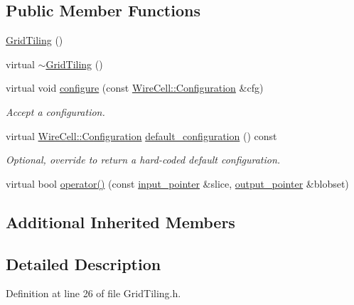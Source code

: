 \subsection*{Public Member Functions}
\begin{DoxyCompactItemize}
\item 
\hyperlink{class_wire_cell_1_1_img_1_1_grid_tiling_af3c3527253987db6b518a38d10c24868}{Grid\+Tiling} ()
\item 
virtual \hyperlink{class_wire_cell_1_1_img_1_1_grid_tiling_ac32a99a32ae16ffc136cdc5ab504ca9a}{$\sim$\+Grid\+Tiling} ()
\item 
virtual void \hyperlink{class_wire_cell_1_1_img_1_1_grid_tiling_a495a866d4d11c4132a390606521de576}{configure} (const \hyperlink{namespace_wire_cell_a9f705541fc1d46c608b3d32c182333ee}{Wire\+Cell\+::\+Configuration} \&cfg)
\begin{DoxyCompactList}\small\item\em Accept a configuration. \end{DoxyCompactList}\item 
virtual \hyperlink{namespace_wire_cell_a9f705541fc1d46c608b3d32c182333ee}{Wire\+Cell\+::\+Configuration} \hyperlink{class_wire_cell_1_1_img_1_1_grid_tiling_a07e25b71cdc6a66871cd66c55ef6a68c}{default\+\_\+configuration} () const
\begin{DoxyCompactList}\small\item\em Optional, override to return a hard-\/coded default configuration. \end{DoxyCompactList}\item 
virtual bool \hyperlink{class_wire_cell_1_1_img_1_1_grid_tiling_ad1b3636679572ca647161f331252356c}{operator()} (const \hyperlink{class_wire_cell_1_1_i_function_node_a55c0946156df9b712b8ad1a0b59b2db6}{input\+\_\+pointer} \&slice, \hyperlink{class_wire_cell_1_1_i_function_node_afc02f1ec60d31aacddf64963f9ca650b}{output\+\_\+pointer} \&blobset)
\end{DoxyCompactItemize}
\subsection*{Additional Inherited Members}


\subsection{Detailed Description}


Definition at line 26 of file Grid\+Tiling.\+h.



